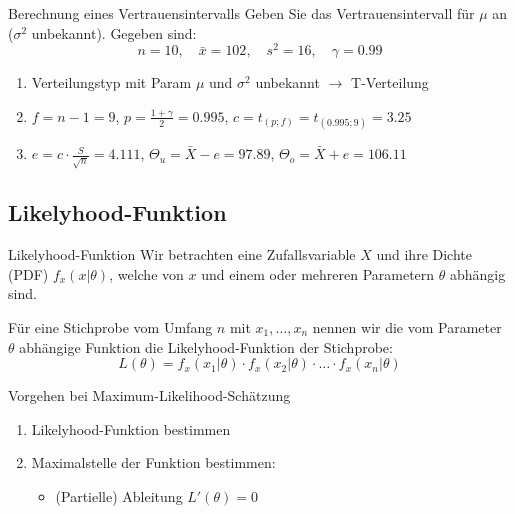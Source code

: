 \begin{example}{Berechnung eines Vertrauensintervalls}
Geben Sie das Vertrauensintervall für $\mu$ an ($\sigma^2$ unbekannt). Gegeben sind:
$$
n=10, \quad \bar{x}=102, \quad s^2=16, \quad \gamma=0.99
$$

\begin{enumerate}
  \item Verteilungstyp mit Param $\mu$ und $\sigma^2$ unbekannt $\rightarrow$ T-Verteilung
  \item $f=n-1=9$, $p=\frac{1+\gamma}{2}=0.995$, $c=t_{(p;f)}=t_{(0.995;9)}=3.25$
  \item $e=c \cdot \frac{S}{\sqrt{n}}=4.111$, $\Theta_u=\bar{X}-e=97.89$, $\Theta_o=\bar{X}+e=106.11$
\end{enumerate}
\end{example}

\subsection{Likelyhood-Funktion}
\begin{definition}{Likelyhood-Funktion}
Wir betrachten eine Zufallsvariable $X$ und ihre Dichte (PDF) $f_x(x|\theta)$, welche von $x$ und einem oder mehreren Parametern $\theta$ abhängig sind. 

Für eine Stichprobe vom Umfang $n$ mit $x_1,\ldots,x_n$ nennen wir die vom Parameter $\theta$ abhängige Funktion die Likelyhood-Funktion der Stichprobe:
$$
L(\theta)=f_x(x_1|\theta) \cdot f_x(x_2|\theta) \cdot \ldots \cdot f_x(x_n|\theta)
$$
\end{definition}

\begin{concept}{Vorgehen bei Maximum-Likelihood-Schätzung}
\begin{enumerate}
  \item Likelyhood-Funktion bestimmen
  \item Maximalstelle der Funktion bestimmen:
        \begin{itemize}
           \item (Partielle) Ableitung $L'(\theta)=0$
        \end{itemize}
\end{enumerate}
\end{concept}
